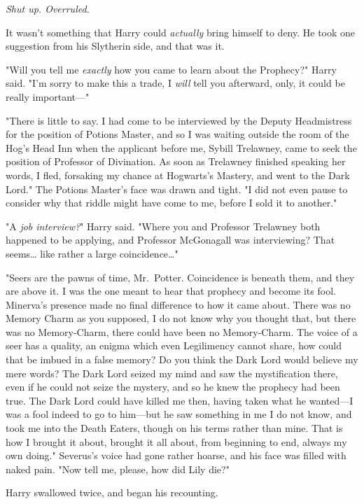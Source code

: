 \emph{Shut up. Overruled.}

It wasn't something that Harry could \emph{actually} bring himself to deny. He took one suggestion from his Slytherin side, and that was it.

"Will you tell me \emph{exactly} how you came to learn about the Prophecy?" Harry said. "I'm sorry to make this a trade, I \emph{will} tell you afterward, only, it could be really important---"

"There is little to say. I had come to be interviewed by the Deputy Headmistress for the position of Potions Master, and so I was waiting outside the room of the Hog's Head Inn when the applicant before me, Sybill Trelawney, came to seek the position of Professor of Divination. As soon as Trelawney finished speaking her words, I fled, forsaking my chance at Hogwarts's Mastery, and went to the Dark Lord." The Potions Master's face was drawn and tight. "I did not even pause to consider why that riddle might have come to me, before I sold it to another."

"A \emph{job interview?}" Harry said. "Where you and Professor Trelawney both happened to be applying, and Professor McGonagall was interviewing? That seems{\ldots} like rather a large coincidence{\ldots}"

"Seers are the pawns of time, Mr.~Potter. Coincidence is beneath them, and they are above it. I was the one meant to hear that prophecy and become its fool. Minerva's presence made no final difference to how it came about. There was no Memory Charm as you supposed, I do not know why you thought that, but there was no Memory-Charm, there could have been no Memory-Charm. The voice of a seer has a quality, an enigma which even Legilimency cannot share, how could that be imbued in a false memory? Do you think the Dark Lord would believe my mere words? The Dark Lord seized my mind and saw the mystification there, even if he could not seize the mystery, and so he knew the prophecy had been true. The Dark Lord could have killed me then, having taken what he wanted---I was a fool indeed to go to him---but he saw something in me I do not know, and took me into the Death Eaters, though on his terms rather than mine. That is how I brought it about, brought it all about, from beginning to end, always my own doing." Severus's voice had gone rather hoarse, and his face was filled with naked pain. "Now tell me, please, how did Lily die?"

Harry swallowed twice, and began his recounting.

